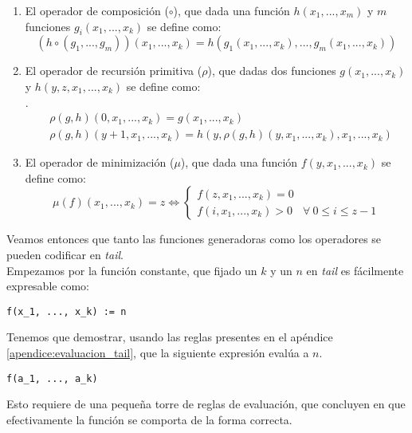 \begin{enumerate}
  \item El operador de composición ($\circ$), que dada una función $h(x_1, ..., x_m)$ y $m$ funciones $g_i(x_1, ..., x_k)$ se define como:\\
  $$(h \circ (g_1, ..., g_m))(x_1, ..., x_k) = h(g_1(x_1, ..., x_k), ..., g_m(x_1, ..., x_k))$$
  
  \item El operador de recursión primitiva ($\rho$), que dadas dos funciones $g(x_1, ..., x_k)$ y $h(y,z,x_1, ..., x_k)$ se define como:\\.
  \begin{align*}
  &\rho(g, h)(0, x_1, ..., x_k) = g(x_1, ..., x_k)\\
  &\rho(g, h)(y+1, x_1, ..., x_k) = h(y, \rho(g, h)(y, x_1, ..., x_k), x_1, ..., x_k)
  \end{align*}
  
  \item El operador de minimización ($\mu$), que dada una función $f(y, x_1, ..., x_k)$ se define como:\\
\[
\mu(f)(x_1, ..., x_k) = z \Leftrightarrow
  \begin{cases}
    f(z, x_1, ..., x_k) = 0\\
    f(i, x_1, ..., x_k) > 0 &\forall\ 0 \leq i \leq z-1
  \end{cases}
\]
  
\end{enumerate}

Veamos entonces que tanto las funciones generadoras como los operadores se pueden codificar en \textit{tail}.\\

Empezamos por la función constante, que fijado un $k$ y un $n$ en \textit{tail} es fácilmente expresable como:\\
\begin{lstlisting}[style=tail]
f(x_1, ..., x_k) := n
\end{lstlisting}

Tenemos que demostrar, usando las reglas presentes en el apéndice \ref{apendice:evaluacion_tail}, que la siguiente expresión evalúa a $n$.\\
\begin{lstlisting}[style=tail]
f(a_1, ..., a_k)
\end{lstlisting}

Esto requiere de una pequeña torre de reglas de evaluación, que concluyen en que efectivamente la función se comporta de la forma correcta.\\

